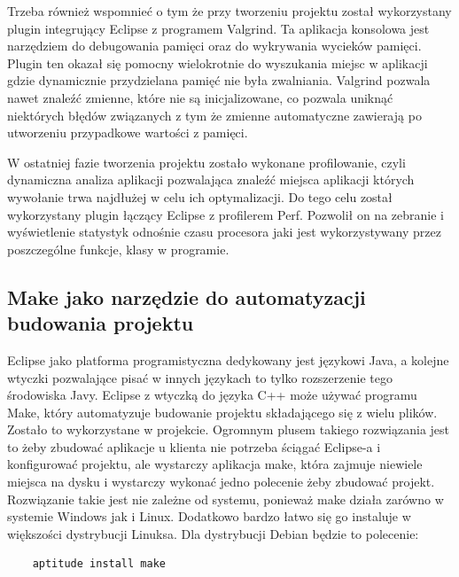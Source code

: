 Trzeba również wspomnieć o tym że przy tworzeniu projektu został wykorzystany plugin integrujący Eclipse z programem Valgrind. 
Ta aplikacja konsolowa jest narzędziem do debugowania pamięci oraz do wykrywania wycieków pamięci. Plugin ten okazał się pomocny wielokrotnie do wyszukania miejsc w aplikacji gdzie dynamicznie przydzielana pamięć nie była zwalniania. Valgrind pozwala nawet znaleźć zmienne, które nie są inicjalizowane, co pozwala uniknąć niektórych błędów związanych z tym że zmienne automatyczne zawierają po utworzeniu przypadkowe wartości z pamięci. 

W ostatniej fazie tworzenia projektu zostało wykonane profilowanie, czyli dynamiczna analiza aplikacji pozwalająca znaleźć miejsca aplikacji których wywołanie trwa najdłużej w celu ich optymalizacji. Do tego celu został wykorzystany plugin łączący Eclipse z profilerem Perf. Pozwolił on na zebranie i wyświetlenie statystyk odnośnie czasu procesora jaki jest wykorzystywany przez poszczególne funkcje, klasy w programie.

\subsection{Make jako narzędzie do automatyzacji budowania projektu}
\hspace{1cm} Eclipse jako platforma programistyczna dedykowany jest językowi Java, a kolejne wtyczki pozwalające pisać w innych językach to tylko rozszerzenie tego środowiska Javy. Eclipse z wtyczką do języka C++ może używać programu Make, który automatyzuje budowanie projektu składającego się z wielu plików. Zostało to wykorzystane w projekcie. Ogromnym plusem takiego rozwiązania jest to żeby zbudować aplikacje u klienta nie potrzeba ściągać Eclipse-a i konfigurować projektu, ale wystarczy aplikacja make, która zajmuje niewiele miejsca na dysku i  wystarczy wykonać jedno polecenie żeby zbudować projekt. Rozwiązanie takie jest nie zależne od systemu, ponieważ make działa zarówno w systemie Windows jak i Linux. Dodatkowo bardzo łatwo się go instaluje w większości dystrybucji Linuksa. Dla dystrybucji Debian będzie to polecenie:

\begin{center}
\begin{verbatim}
	aptitude install make
\end{verbatim}
\end{center}


